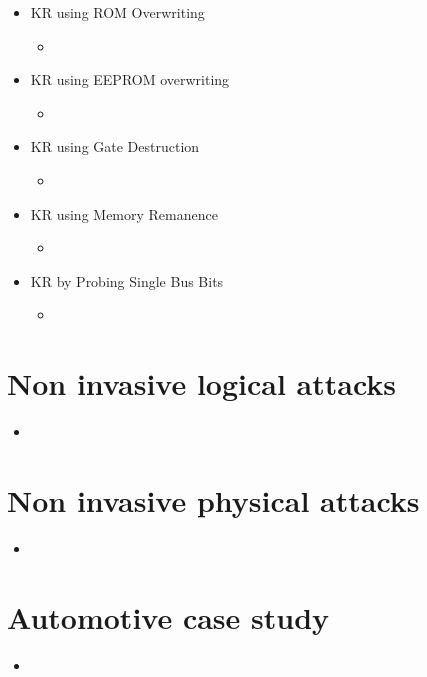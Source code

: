 \documentclass[11pt, paper=a4, twocolumn]{scrartcl}
\begin{document}
\begin{itemize}
\begin{itemize}
\begin{itemize}
						\end{itemize}
					\item KR using ROM Overwriting
						\begin{itemize}
							\item 
						\end{itemize}
					\item KR using EEPROM overwriting
						\begin{itemize}
							\item 
						\end{itemize}
					\item KR using Gate Destruction
						\begin{itemize}
							\item 
						\end{itemize}
					\item KR using Memory Remanence
						\begin{itemize}
							\item 
						\end{itemize}
					\item KR by Probing Single Bus Bits
						\begin{itemize}
							\item 
						\end{itemize}
				\end{itemize}

		\end{itemize}

	\section{Non invasive logical attacks}
		\begin{itemize}
			\item 
		\end{itemize}

	\section{Non invasive physical attacks}
		\begin{itemize}
			\item 
		\end{itemize}

	\section{Automotive case study}
		\begin{itemize}
			\item 
		\end{itemize}
\end{document}
